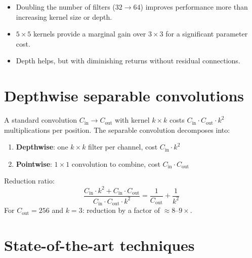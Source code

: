 \begin{remark}
\begin{itemize}
  \item Doubling the number of filters ($32 \to 64$) improves performance
    more than increasing kernel size or depth.
  \item $5 \times 5$ kernels provide a marginal gain over $3 \times 3$
    for a significant parameter cost.
  \item Depth helps, but with diminishing returns without residual
    connections.
\end{itemize}
\end{remark}

\section{Depthwise separable convolutions}
\label{sec:depthwise-separable}

\begin{keyformulas}[title=\textbf{Depthwise separable convolution}]
A standard convolution $C_{\text{in}} \to C_{\text{out}}$ with kernel $k \times k$
costs $C_{\text{in}} \cdot C_{\text{out}} \cdot k^2$ multiplications per position.
The separable convolution decomposes into:
\begin{enumerate}
  \item \textbf{Depthwise}: one $k \times k$ filter per channel, cost $C_{\text{in}} \cdot k^2$
  \item \textbf{Pointwise}: $1 \times 1$ convolution to combine, cost $C_{\text{in}} \cdot C_{\text{out}}$
\end{enumerate}
Reduction ratio:
\begin{equation}
\frac{C_{\text{in}} \cdot k^2 + C_{\text{in}} \cdot C_{\text{out}}}{C_{\text{in}} \cdot C_{\text{out}} \cdot k^2}
= \frac{1}{C_{\text{out}}} + \frac{1}{k^2}
\end{equation}
For $C_{\text{out}} = 256$ and $k = 3$: reduction by a factor of $\approx 8\text{--}9\times$.
\end{keyformulas}

\section{State-of-the-art techniques}
\label{sec:cnn-sota}

